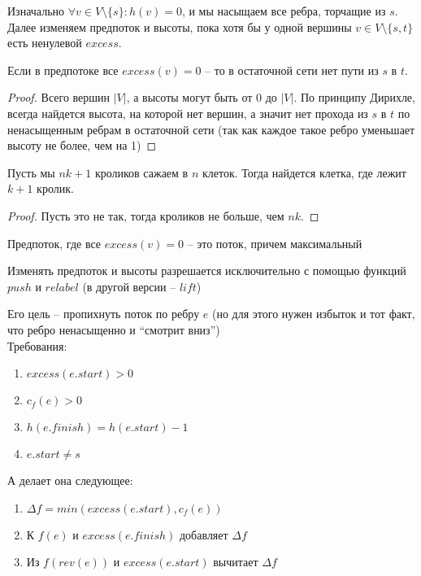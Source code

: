 \noindent Изначально $\forall v \in V \setminus \{s\}: h(v) = 0$, и мы насыщаем все ребра, торчащие из $s$.
Далее изменяем предпоток и высоты, пока хотя бы у одной вершины $v \in V \setminus \{s, t\}$ есть ненулевой $excess$.

\begin{proposition}
    Если в предпотоке все $excess(v) = 0$ -- то в остаточной сети нет пути из $s$ в $t$.
\end{proposition}

\begin{proof}
    Всего вершин $|V|$, а высоты могут быть от 0 до $|V|$. По принципу Дирихле, всегда найдется высота, на которой нет вершин, а значит нет прохода из $s$ в $t$ по ненасыщенным ребрам в остаточной сети (так как каждое такое ребро уменьшает высоту не более, чем на 1)
\end{proof}

\begin{theorem}[Дирихле]
    Пусть мы $nk + 1$ кроликов сажаем в $n$ клеток. Тогда найдется клетка, где лежит $k + 1$ кролик.
\end{theorem}

\begin{proof}
    Пусть это не так, тогда кроликов не больше, чем $nk$.
\end{proof}

\begin{corollary}
    Предпоток, где все $excess(v) = 0$ -- это поток, причем максимальный
\end{corollary}

\noindent Изменять предпоток и высоты разрешается исключительно с помощью функций $push$ и $relabel$ (в другой версии -- $lift$)

\begin{definition}[$push(e \in E_f)$]
    Его цель -- пропихнуть поток по ребру $e$ (но для этого нужен избыток и тот факт, что ребро ненасыщенно и ``смотрит вниз'') \\
    Требования:
    \begin{enumerate}
        \item $excess(e.start) > 0$
        \item $c_f(e) > 0$
        \item $h(e.finish) = h(e.start) - 1$
        \item $e.start \neq s$
    \end{enumerate}
    А делает она следующее:
    \begin{enumerate}
        \item $\Delta f = min(excess(e.start), c_f(e))$
        \item К $f(e)$ и $excess(e.finish)$ добавляет $\Delta f$
        \item Из $f(rev(e))$ и $excess(e.start)$ вычитает $\Delta f$
    \end{enumerate}
\end{definition}

